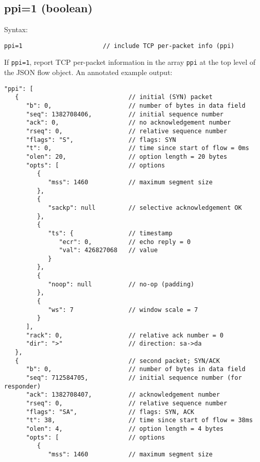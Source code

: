 \documentclass{book}
\begin{document}
\subsection{ppi=1 (boolean)}
\label{salt}
\begin{mdframed}[style=aaa]
Syntax:
  \begin{verbatim}
ppi=1                      // include TCP per-packet info (ppi)
  \end{verbatim}
\end{mdframed}
If \texttt{ppi=1}, report TCP per-packet information in the array
\texttt{ppi} at the top level of the JSON flow object.  An annotated
example output:
\begin{mdframed}[style=cli]
\begin{verbatim}
"ppi": [
   {                              // initial (SYN) packet
      "b": 0,                     // number of bytes in data field
      "seq": 1382708406,          // initial sequence number
      "ack": 0,                   // no acknowledgement number 
      "rseq": 0,                  // relative sequence number
      "flags": "S",               // flags: SYN
      "t": 0,                     // time since start of flow = 0ms
      "olen": 20,                 // option length = 20 bytes 
      "opts": [                   // options
         {
            "mss": 1460           // maximum segment size
         }, 
         {
            "sackp": null         // selective acknowledgement OK
         }, 
         {
            "ts": {               // timestamp
               "ecr": 0,          // echo reply = 0
               "val": 426827068   // value
            }
         }, 
         {
            "noop": null          // no-op (padding)
         }, 
         {
            "ws": 7               // window scale = 7
         }
      ], 
      "rack": 0,                  // relative ack number = 0
      "dir": ">"                  // direction: sa->da
   }, 
   {                              // second packet; SYN/ACK
      "b": 0,                     // number of bytes in data field
      "seq": 712584705,           // initial sequence number (for responder)
      "ack": 1382708407,          // acknowledgement number
      "rseq": 0,                  // relative sequence number
      "flags": "SA",              // flags: SYN, ACK
      "t": 38,                    // time since start of flow = 38ms
      "olen": 4,                  // option length = 4 bytes
      "opts": [                   // options
         {
            "mss": 1460           // maximum segment size

\end{verbatim}
\end{mdframed}
\end{document}
